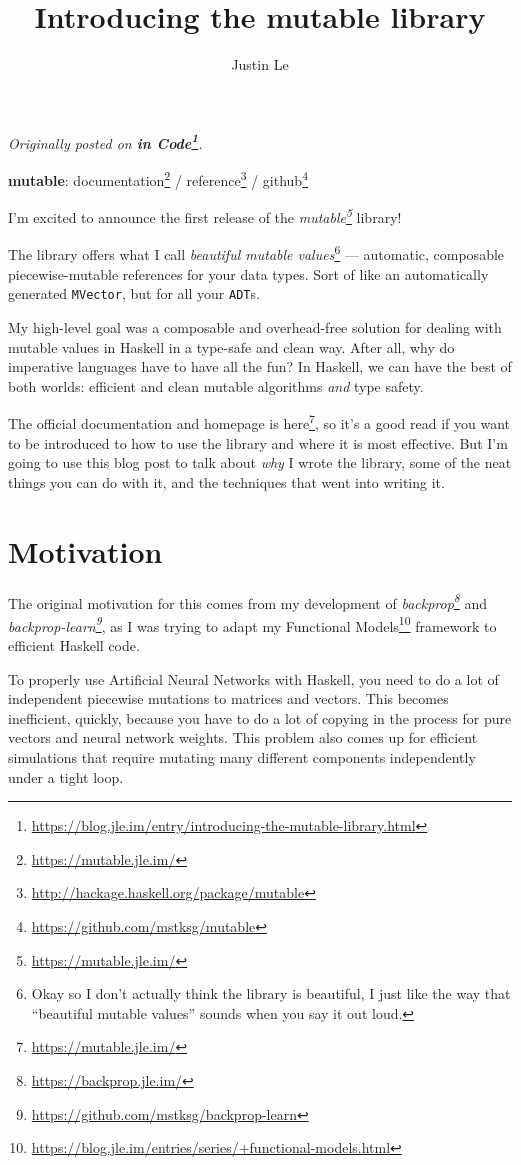 \documentclass[]{article}
\title{Introducing the mutable library}
\author{Justin Le}
\renewcommand{\href}[2]{#2\footnote{\url{#1}}}
\begin{document}
\maketitle

\emph{Originally posted on
\textbf{\href{https://blog.jle.im/entry/introducing-the-mutable-library.html}{in
Code}}.}

\textbf{mutable}: \href{https://mutable.jle.im/}{documentation} /
\href{http://hackage.haskell.org/package/mutable}{reference} /
\href{https://github.com/mstksg/mutable}{github}

I'm excited to announce the first release of the
\emph{\href{https://mutable.jle.im/}{mutable}} library!

The library offers what I call \emph{beautiful mutable values}\footnote{Okay so
  I don't actually think the library is beautiful, I just like the way that
  ``beautiful mutable values'' sounds when you say it out loud.} --- automatic,
composable piecewise-mutable references for your data types. Sort of like an
automatically generated \texttt{MVector}, but for all your \texttt{ADT}s.

My high-level goal was a composable and overhead-free solution for dealing with
mutable values in Haskell in a type-safe and clean way. After all, why do
imperative languages have to have all the fun? In Haskell, we can have the best
of both worlds: efficient and clean mutable algorithms \emph{and} type safety.

The \href{https://mutable.jle.im/}{official documentation and homepage is here},
so it's a good read if you want to be introduced to how to use the library and
where it is most effective. But I'm going to use this blog post to talk about
\emph{why} I wrote the library, some of the neat things you can do with it, and
the techniques that went into writing it.

\hypertarget{motivation}{%
\section{Motivation}\label{motivation}}

The original motivation for this comes from my development of
\emph{\href{https://backprop.jle.im/}{backprop}} and
\emph{\href{https://github.com/mstksg/backprop-learn}{backprop-learn}}, as I was
trying to adapt my
\href{https://blog.jle.im/entries/series/+functional-models.html}{Functional
Models} framework to efficient Haskell code.

To properly use Artificial Neural Networks with Haskell, you need to do a lot of
independent piecewise mutations to matrices and vectors. This becomes
inefficient, quickly, because you have to do a lot of copying in the process for
pure vectors and neural network weights. This problem also comes up for
efficient simulations that require mutating many different components
independently under a tight loop.
\end{document}
